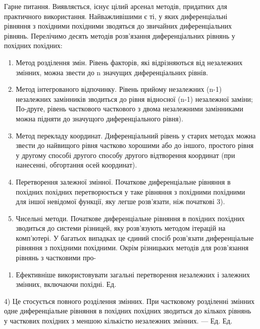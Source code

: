 \documentclass[
  ukrainian,
]{article}
\providecommand{\tightlist}{%
  \setlength{\itemsep}{0pt}\setlength{\parskip}{0pt}}
\begin{document}
Гарне питання. Виявляється, існує цілий арсенал методів, придатних для
практичного використання. Найважливішими є ті, у яких диференціальні
рівняння з похідними похідними зводяться до звичайних диференціальних
рівнянь. Перелічимо десять методів розв'язання диференціальних рівнянь у
похідних похідних:

\begin{enumerate}
\def\labelenumi{\arabic{enumi}.}
\item
  Метод розділення змін. Рівень факторів, які відрізняються від
  незалежних змінних, можна звести до n значущих диференціальних рівнів.
\item
  Метод інтегрованого відпочинку. Рівень прийому незалежних (n-1)
  незалежних замінників зводиться до рівня відносної (n-1) незалежної
  заміни; По-друге, рівень часткового часткового з двома незалежними
  замінниками можна підняти до значущого диференціального рівня).
\item
  Метод перекладу координат. Диференціальний рівень у старих методах
  можна звести до найвищого рівня частково хорошими або до іншого,
  простого рівня у другому способі другого способу другого відтворення
  координат (при нанесенні, обгортання осей координат).
\item
  Перетворення залежної змінної. Початкове диференціальне рівняння в
  похідних похідних перетворюється у таке рівняння з похідними похідними
  для іншої невідомої функції, яку легше розв'язати, ніж початкові 3).
\item
  Чисельні методи. Початкове диференціальне рівняння в похідних похідних
  зводиться до системи різницей, яку розв'язують методом ітерацій на
  комп'ютері. У багатьох випадках це єдиний спосіб розв'язати
  диференціальне рівняння з похідними похідними. Окрім різницьких
  методів для розв'язання рівнянь з частковими про-
\end{enumerate}

\begin{enumerate}
\def\labelenumi{\alph{enumi})}
\setcounter{enumi}{4}
\tightlist
\item
  Ефективніше використовувати загальні перетворення незалежних і
  залежних змінних, включаючи похідні. Ед.
\end{enumerate}

4) Це стосується повного розділення змінних. При частковому розділенні
змінних одне диференціальне рівняння в похідних похідних зводиться до
кількох рівнянь у часткових похідних з меншою кількістю незалежних
змінних. --- Ед. Ед.
\end{document}
